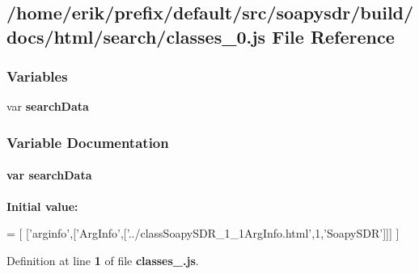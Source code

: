 \subsection{/home/erik/prefix/default/src/soapysdr/build/docs/html/search/classes\+\_\+0.js File Reference}
\label{classes__0_8js}
\subsubsection*{Variables}
\begin{DoxyCompactItemize}
\item 
var {\bf search\+Data}
\end{DoxyCompactItemize}


\subsubsection{Variable Documentation}
\paragraph[{search\+Data}]{\setlength{\rightskip}{0pt plus 5cm}var search\+Data}\label{classes__0_8js_ad01a7523f103d6242ef9b0451861231e}
{\bfseries Initial value\+:}
\begin{DoxyCode}
=
[
  [\textcolor{stringliteral}{'arginfo'},[\textcolor{stringliteral}{'ArgInfo'},[\textcolor{stringliteral}{'../classSoapySDR\_1\_1ArgInfo.html'},1,\textcolor{stringliteral}{'SoapySDR'}]]]
]
\end{DoxyCode}


Definition at line {\bf 1} of file {\bf classes\+\_.\+js}.

